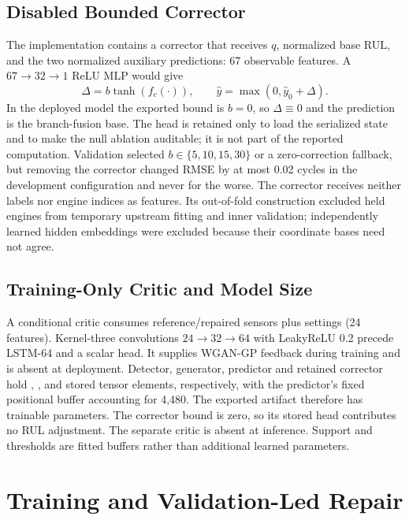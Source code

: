 \documentclass[conference]{IEEEtran}
\begin{document}
\subsection{\textbf{Disabled Bounded Corrector}}
The implementation contains a corrector that receives $q$, normalized base RUL, and the two normalized auxiliary predictions: 67 observable features. A $67\rightarrow32\rightarrow1$ ReLU MLP would give
\begin{equation}
 \Delta=b\tanh(f_c(\cdot)),\qquad
 \hat y=\max(0,\hat y_0+\Delta).
 \label{eq:correction}
\end{equation}
In the deployed model the exported bound is $b=0$, so $\Delta\equiv0$ and the prediction is the branch-fusion base. The head is retained only to load the serialized state and to make the null ablation auditable; it is not part of the reported computation. Validation selected $b\in\{5,10,15,30\}$ or a zero-correction fallback, but removing the corrector changed RMSE by at most 0.02 cycles in the development configuration and never for the worse. The corrector receives neither labels nor engine indices as features. Its out-of-fold construction excluded held engines from temporary upstream fitting and inner validation; independently learned hidden embeddings were excluded because their coordinate bases need not agree.

\subsection{\textbf{Training-Only Critic and Model Size}}
A conditional critic consumes reference/repaired sensors plus settings (24 features). Kernel-three convolutions $24\rightarrow32\rightarrow64$ with LeakyReLU 0.2 precede LSTM-64 and a scalar head. It supplies WGAN-GP feedback during training and is absent at deployment. Detector, generator, predictor and retained corrector hold \CurrentDetectorParameters{}, \CurrentGeneratorParameters{}, \CurrentPredictorParameters{} and \CurrentCorrectorParameters{} stored tensor elements, respectively, with the predictor's fixed positional buffer accounting for 4,480. The exported artifact therefore has \CurrentParams{} trainable parameters. The corrector bound is zero, so its stored head contributes no RUL adjustment. The separate critic is absent at inference. Support and thresholds are fitted buffers rather than additional learned parameters.

\section{\textbf{Training and Validation-Led Repair}}
\label{sec:workflow}

\end{document}
